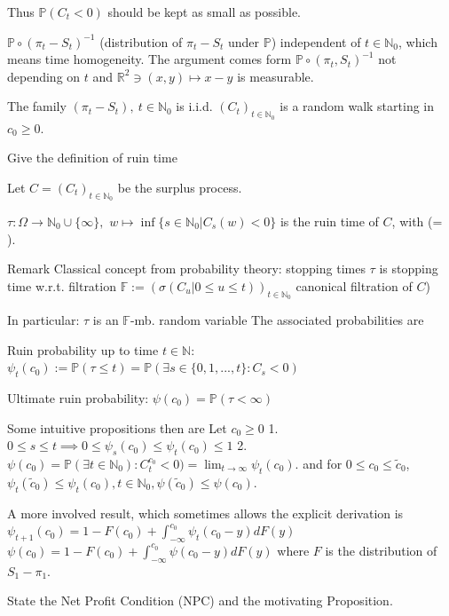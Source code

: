 \documentclass[11pt,a4paper,twoside]{article}
\begin{document}
Thus \( \mathbb{P}(C_t < 0) \) should be kept as small as possible.

\( \mathbb{P}\circ(\pi_t - S_t)^{-1} \) (distribution of \( \pi_t - S_t \) under \( \mathbb{P} \)) 
independent of \( t \in \mathbb{N}_0 \), which means time homogeneity.
The argument comes form \( \mathbb{P} \circ (\pi_t, S_t)^{-1} \) not depending on 
\( t \) and \( \mathbb{R}^2 \ni (x, y) \mapsto x - y \) is measurable.

The family \( (\pi_t - S_t),\ t \in \mathbb{N}_0 \) is i.i.d.
\( (C_t)_{t \in \mathbb{N}_0} \) is a random walk starting in \( c_0 \geq 0 \).



Give the definition of ruin time

Let \(C = (C_t)_{t \in \mathbb{N}_0}\) be the surplus process.

\(\tau: \Omega \rightarrow \mathbb{N}_0 \cup \{\infty\},\)
\(w \mapsto \inf \{s \in \mathbb{N}_0 | C_s(w) < 0\} \)
is the ruin time of \(C\), with (\inf \theta = \infty).

Remark
Classical concept from probability theory: stopping times
\(\tau\) is stopping time w.r.t. filtration
\(\mathbb{F} := (\sigma(C_u|0 \le u \le t))_{t \in \mathbb{N}_0}\) 
canonical filtration of \(C\))

In particular: \(\tau\) is an \(\mathbb{F}\)-mb. random variable
The associated probabilities are

Ruin probability up to time \(t \in \mathbb{N}\):
\(\psi_t(c_0) := \mathbb{P}(\tau \le t) = \mathbb{P}(\exists s \in \{0, 1, ..., t\}: C_s < 0)\)

Ultimate ruin probability:
\(\psi(c_0) = \mathbb{P}(\tau < \infty)\)

Some intuitive propositions then are
Let \( c_0 \geq 0 \)
1. \( 0 ≤ s ≤ t \implies 0 \leq \psi_s(c_0) \leq \psi_t(c_0) \leq 1\)
2. \( \psi(c_0) = \mathbb{P}(\exists t \in \mathbb{N}_0) : C_t^{c_0} < 0) = \lim_{t \to \infty} \psi_t(c_0)\).
and for
\( 0 \leq c_0 \leq \tilde{c}_0 \), \( \psi_t(\tilde{c}_0) \leq \psi_t(c_0), t \in \mathbb{N}_0, \psi(\tilde{c}_0) \leq \psi(c_0) \).

A more involved result, which sometimes allows the explicit derivation is
\( \psi_{t+1}(c_0) = 1 - F(c_0) + \int_{-\infty}^{c_0} \psi_t(c_0 - y)dF(y) \)
\( \psi(c_0) = 1 - F(c_0) + \int_{-\infty}^{c_0} \psi(c_0 - y)dF(y) \)
where \( F \) is the distribution of \( S_1 - \pi_1 \).


State the Net Profit Condition (NPC) and the motivating Proposition.
\end{document}
